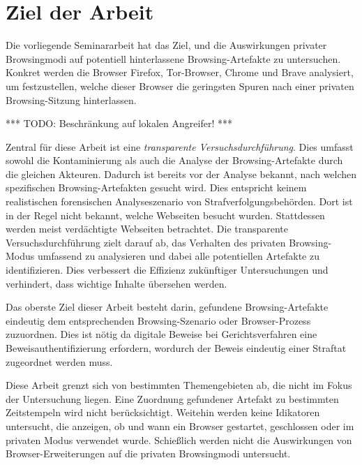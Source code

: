 \chapter{Ziel der Arbeit}
Die vorliegende Seminararbeit hat das Ziel, und die Auswirkungen privater Browsingmodi auf potentiell hinterlassene Browsing-Artefakte zu untersuchen. Konkret werden die Browser Firefox, Tor-Browser, Chrome und Brave analysiert, um festzustellen, welche dieser Browser die geringsten Spuren nach einer privaten Browsing-Sitzung hinterlassen.

*** TODO: Beschränkung auf lokalen Angreifer! ***

Zentral für diese Arbeit ist eine \textit{transparente Versuchsdurchführung}. Dies umfasst sowohl die Kontaminierung als auch die Analyse der Browsing-Artefakte durch die gleichen Akteuren. Dadurch ist bereits vor der Analyse bekannt, nach welchen spezifischen Browsing-Artefakten gesucht wird. Dies entspricht keinem realistischen forensischen Analyseszenario von Strafverfolgungsbehörden. Dort ist in der Regel nicht bekannt, welche Webseiten besucht wurden. Stattdessen werden meist verdächtigte Webseiten betrachtet.
Die transparente Versuchsdurchführung zielt darauf ab, das Verhalten des privaten Browsing-Modus umfassend zu analysieren und dabei alle potentiellen Artefakte zu identifizieren. Dies verbessert die Effizienz zukünftiger Untersuchungen und verhindert, dass wichtige Inhalte übersehen werden. \cite{Horsman.2019}

Das oberste Ziel dieser Arbeit besteht darin, gefundene Browsing-Artefakte eindeutig dem entsprechenden Browsing-Szenario oder Browser-Prozess zuzuordnen. 
Dies ist nötig da digitale Beweise bei Gerichtsverfahren eine Beweisauthentifizierung erfordern, wordurch der Beweis eindeutig einer Straftat zugeordnet werden muss.

Diese Arbeit grenzt sich von bestimmten Themengebieten ab, die nicht im Fokus der Untersuchung liegen. Eine Zuordnung gefundener Artefakt zu bestimmten Zeitstempeln wird nicht berücksichtigt. 
Weitehin werden keine Idikatoren untersucht, die anzeigen, ob und wann ein Browser gestartet, geschlossen oder im privaten Modus verwendet wurde.
Schießlich werden nicht die Auswirkungen von Browser-Erweiterungen auf die privaten Browsingmodi untersucht.

